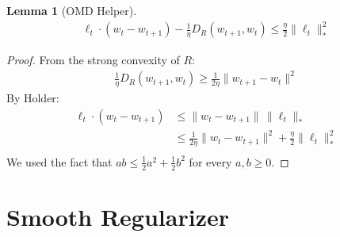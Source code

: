 \documentclass[10pt]{article}
\newtheorem{lemma}[theorem]{Lemma}
\theoremstyle{definition}
\theoremstyle{remark}
\begin{document}
\begin{lemma}[OMD Helper]\label{lem:omd helper}
\begin{align*}
\ell_t \cdot (w_t-w_{t+1}) - \frac1\eta D_R(w_{t+1},w_t)
\leq 
\frac\eta2\|\ell_t\|_*^2
\end{align*}
\end{lemma}
\begin{proof}
From the strong convexity of $R$:
\begin{align*}
\frac1\eta D_R(w_{t+1},w_t)
\geq 
\frac{1}{2\eta} \|w_{t+1}-w_t\|^2
\end{align*}
By Holder:
\begin{align*}
\ell_t \cdot (w_t-w_{t+1}) 
&\leq \|w_t-w_{t+1}\| \, \|\ell_t\|_*
\\
&\leq \frac{1}{2\eta} \|w_t-w_{t+1}\|^2 + \frac{\eta}{2} \|\ell_t\|_*^2\\
\end{align*}
We used the fact that $ab \le \frac{1}{2}a^2 + \frac{1}{2}b^2$ for every $a,b\ge 0$. 
\end{proof}

\section{Smooth Regularizer}\label{apx:smooth}
\end{document}
